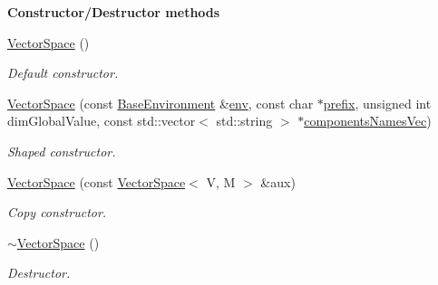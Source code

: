 \begin{Indent}{\bf Constructor/\-Destructor methods}\par
\begin{DoxyCompactItemize}
\item 
\hyperlink{class_q_u_e_s_o_1_1_vector_space_ab64f81dae5d122ec818fe96ea404f93c}{Vector\-Space} ()
\begin{DoxyCompactList}\small\item\em Default constructor. \end{DoxyCompactList}\item 
\hyperlink{class_q_u_e_s_o_1_1_vector_space_af4603e4342db319c34fe236b9e057f0e}{Vector\-Space} (const \hyperlink{class_q_u_e_s_o_1_1_base_environment}{Base\-Environment} \&\hyperlink{class_q_u_e_s_o_1_1_vector_space_aa74cd0d1a8b3d599f799ef4aa2ebcfc2}{env}, const char $\ast$\hyperlink{class_q_u_e_s_o_1_1_vector_set_aedcd4b0f502af4c6e6df863c13cddfec}{prefix}, unsigned int dim\-Global\-Value, const std\-::vector$<$ std\-::string $>$ $\ast$\hyperlink{class_q_u_e_s_o_1_1_vector_space_aa315ff4efb4be69a64e341e3ebddca56}{components\-Names\-Vec})
\begin{DoxyCompactList}\small\item\em Shaped constructor. \end{DoxyCompactList}\item 
\hyperlink{class_q_u_e_s_o_1_1_vector_space_aa0677ad2c58ce91321d07f377ffe39f4}{Vector\-Space} (const \hyperlink{class_q_u_e_s_o_1_1_vector_space}{Vector\-Space}$<$ V, M $>$ \&aux)
\begin{DoxyCompactList}\small\item\em Copy constructor. \end{DoxyCompactList}\item 
\hyperlink{class_q_u_e_s_o_1_1_vector_space_a0e543a391950b82f1107b1bd589ebd72}{$\sim$\-Vector\-Space} ()
\begin{DoxyCompactList}\small\item\em Destructor. \end{DoxyCompactList}\end{DoxyCompactItemize}
\end{Indent}
